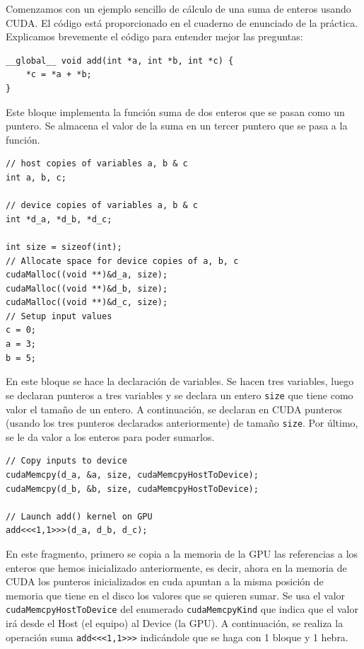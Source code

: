 \documentclass[11pt]{article}
\def\inline{\lstinline[basicstyle=\ttfamily,keywordstyle={}]}
\newcounter{enunciado}
\begin{document}
Comenzamos con un ejemplo sencillo de cálculo de una suma de enteros usando CUDA. El código está proporcionado en el cuaderno de enunciado de la práctica. Explicamos brevemente el código para entender mejor las preguntas:

\begin{verbatim}
__global__ void add(int *a, int *b, int *c) {
	*c = *a + *b;
}
\end{verbatim}
Este bloque implementa la función suma de dos enteros que se pasan como un puntero. Se almacena el valor de la suma en un tercer puntero que se pasa a la función.

\begin{verbatim}
// host copies of variables a, b & c
int a, b, c;

// device copies of variables a, b & c  
int *d_a, *d_b, *d_c;

int size = sizeof(int);
// Allocate space for device copies of a, b, c
cudaMalloc((void **)&d_a, size);
cudaMalloc((void **)&d_b, size);
cudaMalloc((void **)&d_c, size);
// Setup input values  
c = 0;
a = 3;
b = 5;
\end{verbatim}

En este bloque se hace la declaración de variables. Se hacen tres variables, luego se declaran punteros a tres variables y se declara un entero \inline{size} que tiene como valor el tamaño de un entero. A continuación, se declaran en CUDA punteros (usando los tres punteros declarados anteriormente) de tamaño \inline{size}. Por último, se le da valor a los enteros para poder sumarlos.

\begin{verbatim}
// Copy inputs to device
cudaMemcpy(d_a, &a, size, cudaMemcpyHostToDevice);
cudaMemcpy(d_b, &b, size, cudaMemcpyHostToDevice);

// Launch add() kernel on GPU
add<<<1,1>>>(d_a, d_b, d_c);  
\end{verbatim}

En este fragmento, primero se copia a la memoria de la GPU las referencias a los enteros que hemos inicializado anteriormente, es decir, ahora en la memoria de CUDA los punteros inicializados en cuda apuntan a la misma posición de memoria que tiene en el disco los valores que se quieren sumar. Se usa el valor \inline{cudaMemcpyHostToDevice} del enumerado \inline{cudaMemcpyKind} que indica que el valor irá desde el Host (el equipo) al Device (la GPU). A continuación, se realiza la operación suma \inline{add<<<1,1>>>} indicándole que se haga con 1 bloque y 1 hebra. 
\end{document}
